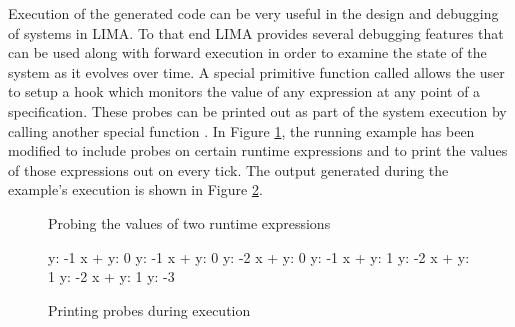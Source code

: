 Execution of the generated code can be very useful in the design and debugging
of systems in LIMA. To that end LIMA provides several debugging features that
can be used along with forward execution in order to examine the state of the
system as it evolves over time. A special primitive function called 
allows the user to setup a hook which monitors the value of any expression at
any point of a specification. These probes can be printed out as part of the
system execution by calling another special function . In Figure
\ref{fig:code-gen-probes}, the running example has been modified to include
probes on certain runtime expressions and to print the values of those
expressions out on every tick. The output generated during the example's
execution is shown in Figure \ref{fig:code-gen-print-probes}.

\begin{figure}
\caption{Probing the values of two runtime expressions}
\label{fig:code-gen-probes}
\end{figure}

\begin{figure}
\begin{plaintext}
y: -1
x + y: 0
y: -1
x + y: 0
y: -2
x + y: 0
y: -1
x + y: 1
y: -2
x + y: 1
y: -2
x + y: 1
y: -3
\end{plaintext}
\caption{Printing probes during execution}
\label{fig:code-gen-print-probes}
\end{figure}



